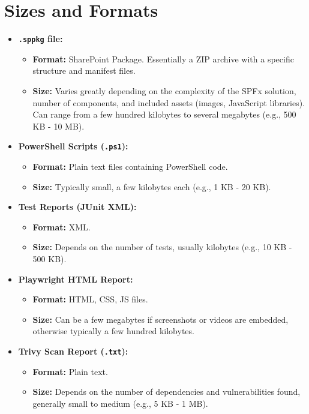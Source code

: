 \section{Sizes and Formats}
\label{sec:ArtifactSizesFormats}

\begin{itemize}
    \item \textbf{\texttt{.sppkg} file:}
    \begin{itemize}
        \item \textbf{Format:} SharePoint Package. Essentially a ZIP archive with a specific structure and manifest files.
        \item \textbf{Size:} Varies greatly depending on the complexity of the SPFx solution, number of components, and included assets (images, JavaScript libraries). Can range from a few hundred kilobytes to several megabytes (e.g., 500 KB - 10 MB).
    \end{itemize}
    \item \textbf{PowerShell Scripts (\texttt{.ps1}):}
    \begin{itemize}
        \item \textbf{Format:} Plain text files containing PowerShell code.
        \item \textbf{Size:} Typically small, a few kilobytes each (e.g., 1 KB - 20 KB).
    \end{itemize}
    \item \textbf{Test Reports (JUnit XML):}
    \begin{itemize}
        \item \textbf{Format:} XML.
        \item \textbf{Size:} Depends on the number of tests, usually kilobytes (e.g., 10 KB - 500 KB).
    \end{itemize}
    \item \textbf{Playwright HTML Report:}
    \begin{itemize}
        \item \textbf{Format:} HTML, CSS, JS files.
        \item \textbf{Size:} Can be a few megabytes if screenshots or videos are embedded, otherwise typically a few hundred kilobytes.
    \end{itemize}
    \item \textbf{Trivy Scan Report (\texttt{.txt}):}
    \begin{itemize}
        \item \textbf{Format:} Plain text.
        \item \textbf{Size:} Depends on the number of dependencies and vulnerabilities found, generally small to medium (e.g., 5 KB - 1 MB).
    \end{itemize}
\end{itemize}

